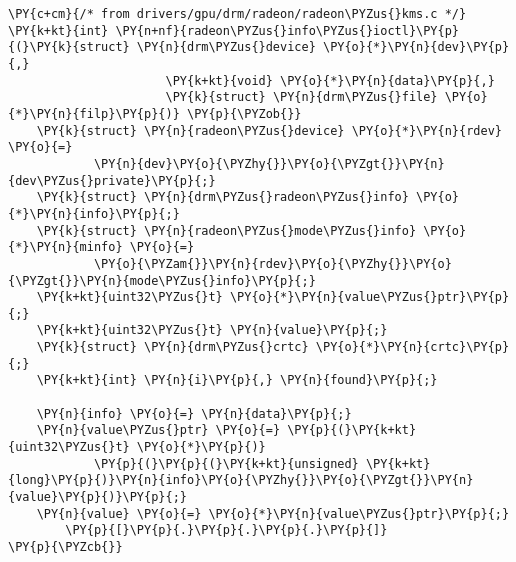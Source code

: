 \begin{Verbatim}[commandchars=\\\{\}]
\PY{c+cm}{/* from drivers/gpu/drm/radeon/radeon\PYZus{}kms.c */}
\PY{k+kt}{int} \PY{n+nf}{radeon\PYZus{}info\PYZus{}ioctl}\PY{p}{(}\PY{k}{struct} \PY{n}{drm\PYZus{}device} \PY{o}{*}\PY{n}{dev}\PY{p}{,}
                      \PY{k+kt}{void} \PY{o}{*}\PY{n}{data}\PY{p}{,}
                      \PY{k}{struct} \PY{n}{drm\PYZus{}file} \PY{o}{*}\PY{n}{filp}\PY{p}{)} \PY{p}{\PYZob{}}
	\PY{k}{struct} \PY{n}{radeon\PYZus{}device} \PY{o}{*}\PY{n}{rdev} \PY{o}{=}
            \PY{n}{dev}\PY{o}{\PYZhy{}}\PY{o}{\PYZgt{}}\PY{n}{dev\PYZus{}private}\PY{p}{;}
	\PY{k}{struct} \PY{n}{drm\PYZus{}radeon\PYZus{}info} \PY{o}{*}\PY{n}{info}\PY{p}{;}
	\PY{k}{struct} \PY{n}{radeon\PYZus{}mode\PYZus{}info} \PY{o}{*}\PY{n}{minfo} \PY{o}{=}
            \PY{o}{\PYZam{}}\PY{n}{rdev}\PY{o}{\PYZhy{}}\PY{o}{\PYZgt{}}\PY{n}{mode\PYZus{}info}\PY{p}{;}
	\PY{k+kt}{uint32\PYZus{}t} \PY{o}{*}\PY{n}{value\PYZus{}ptr}\PY{p}{;}
	\PY{k+kt}{uint32\PYZus{}t} \PY{n}{value}\PY{p}{;}
	\PY{k}{struct} \PY{n}{drm\PYZus{}crtc} \PY{o}{*}\PY{n}{crtc}\PY{p}{;}
	\PY{k+kt}{int} \PY{n}{i}\PY{p}{,} \PY{n}{found}\PY{p}{;}

	\PY{n}{info} \PY{o}{=} \PY{n}{data}\PY{p}{;}
	\PY{n}{value\PYZus{}ptr} \PY{o}{=} \PY{p}{(}\PY{k+kt}{uint32\PYZus{}t} \PY{o}{*}\PY{p}{)}
            \PY{p}{(}\PY{p}{(}\PY{k+kt}{unsigned} \PY{k+kt}{long}\PY{p}{)}\PY{n}{info}\PY{o}{\PYZhy{}}\PY{o}{\PYZgt{}}\PY{n}{value}\PY{p}{)}\PY{p}{;}
	\PY{n}{value} \PY{o}{=} \PY{o}{*}\PY{n}{value\PYZus{}ptr}\PY{p}{;}
        \PY{p}{[}\PY{p}{.}\PY{p}{.}\PY{p}{.}\PY{p}{]}
\PY{p}{\PYZcb{}}
\end{Verbatim}
